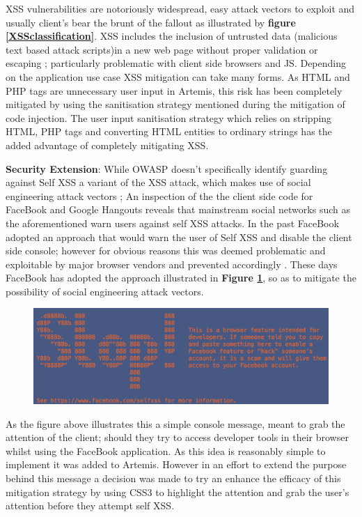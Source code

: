     XSS vulnerabilities are notoriously widespread, easy attack vectors to exploit and  usually client's bear the brunt of the fallout \cite{OWASP2017} as illustrated by \textbf{figure \ref{XSSclassification}}. XSS includes the inclusion of untrusted data (malicious text based attack scripts)in a new web page without proper validation or escaping \cite{OWASP2017}; particularly problematic with client side browsers and JS. Depending on the application use case XSS mitigation can take many forms. As HTML and PHP tags are  unnecessary user input in Artemis, this risk has been completely mitigated by using the sanitisation strategy mentioned during the mitigation of code injection. The user input sanitisation strategy which relies on stripping HTML, PHP tags and  converting HTML entities  to ordinary strings has the added advantage of completely mitigating XSS.
    
    \textbf{Security Extension}: While OWASP doesn't specifically identify guarding against Self XSS  a variant of the XSS attack, which makes use of social engineering attack vectors \cite{FaceBook}; An inspection of the  the client side code for FaceBook and Google Hangouts reveals that mainstream social networks such as the aforementioned warn users against self XSS attacks. In the past FaceBook adopted an approach that would warn the user of Self XSS and disable the client side console; however for obvious reasons this was deemed problematic and exploitable by major browser vendors and prevented accordingly \cite{StackO}. These days FaceBook has adopted the approach illustrated in \textbf{Figure \ref{faceBookSelfXSS}}, so as to mitigate the possibility of social engineering attack vectors.
    
    \begin{figure}[h]
    	\centering
    	\includegraphics[scale=0.75,right]{chapters/chapter03/figures/faceBook.png}
    	\label{faceBookSelfXSS}
    \end{figure}
    
    As the figure above illustrates this a simple console message, meant to grab the attention of the client; should they try to access developer tools in their browser whilst using the FaceBook application. As this idea is reasonably simple to implement it was added to Artemis. However in an effort to extend the purpose behind this message a decision was made to try an enhance the efficacy of this mitigation strategy by using CSS3  to highlight the attention and grab the user's attention before they attempt self XSS.
    
